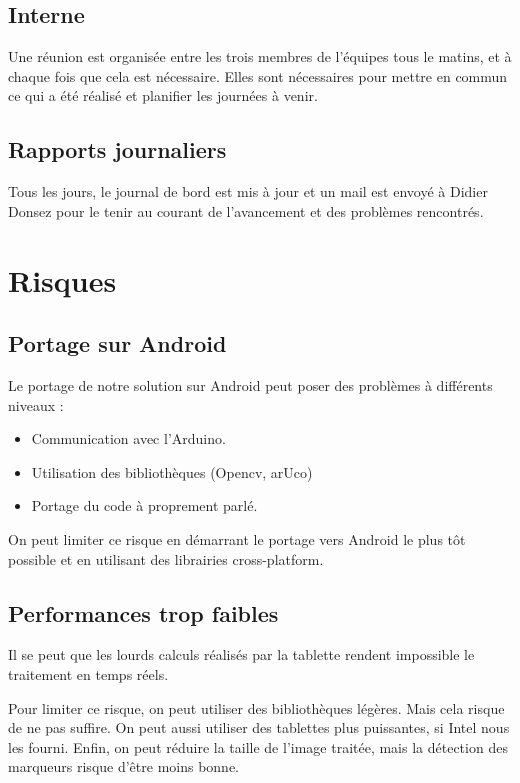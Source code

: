\documentclass[a4paper,12pt]{article}
\begin{document}
\subsection{Interne}

Une réunion est organisée entre les trois membres de l'équipes tous le matins,
et à chaque fois que cela est nécessaire. Elles sont nécessaires pour mettre en
commun ce qui a été réalisé et planifier les journées à venir.

\subsection{Rapports journaliers}

Tous les jours, le journal de bord est mis à jour et un mail est envoyé à
Didier Donsez pour le tenir au courant de l'avancement et des problèmes
rencontrés.





\section{Risques}

\subsection{Portage sur Android}

Le portage de notre solution sur Android peut poser des problèmes à différents
niveaux :
\begin{itemize}
    \item Communication avec l'Arduino.
    \item Utilisation des bibliothèques (Opencv, arUco)
    \item Portage du code à proprement parlé.
\end{itemize}

On peut limiter ce risque en démarrant le portage vers Android le plus tôt
possible et en utilisant des librairies cross-platform.

\subsection{Performances trop faibles}

Il se peut que les lourds calculs réalisés par la tablette rendent impossible
le traitement en temps réels.

Pour limiter ce risque, on peut utiliser des bibliothèques légères. Mais cela
risque de ne pas suffire.
On peut aussi utiliser des tablettes plus puissantes, si Intel nous les fourni.
Enfin, on peut réduire la taille de l'image traitée, mais la détection des
marqueurs risque d'être moins bonne.
\end{document}
